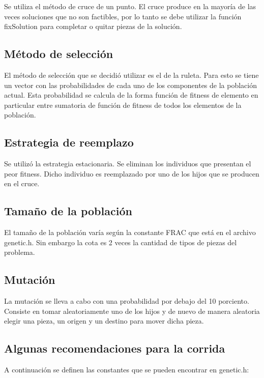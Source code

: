 \documentclass[letter,10pt]{article}
\begin{document}
Se utiliza el método de cruce de un punto. El cruce produce en la mayoría de las veces soluciones que no son factibles, por 
lo tanto se debe utilizar la función fixSolution para completar o quitar piezas de la solución.

\subsection{Método de selección}

El método de selección que se decidió utilizar es el de la ruleta. Para esto se tiene un vector con las probabilidades de 
cada uno de los componentes de la población actual. Esta probabilidad se calcula de la forma función de fitness de elemento 
en particular entre sumatoria de función de fitness de todos los elementos de la población.

\subsection{Estrategia de reemplazo}

Se utilizó la estrategia estacionaria. Se eliminan los individuos que presentan el peor fitness. Dicho individuo 
es reemplazado por uno de los hijos que se producen en el cruce. 

\subsection{Tamaño de la población}

El tamaño de la población varía según la constante FRAC que está en el archivo genetic.h. Sin embargo la cota es 
2 veces la cantidad de tipos de piezas del problema.

\subsection{Mutación}

La mutación se lleva a cabo con una probabilidad por debajo del 10 porciento. Consiste en tomar aleatoriamente uno de los hijos 
y de nuevo de manera aleatoria elegir una pieza, un origen y un destino para mover dicha pieza.

\subsection{Algunas recomendaciones para la corrida}

A continuación se definen las constantes que se pueden encontrar en genetic.h:
\end{document}
